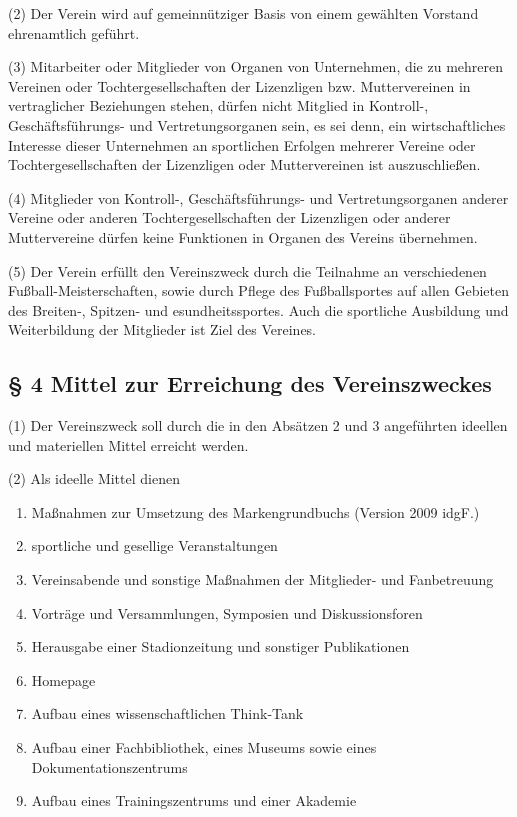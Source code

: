 \documentclass[10pt,a4paper]{article}
\begin{document}
(2)
Der Verein wird auf gemeinnütziger Basis von einem gewählten Vorstand ehrenamtlich geführt.

(3)
Mitarbeiter oder Mitglieder von Organen von Unternehmen, die zu mehreren Vereinen oder Tochtergesellschaften der Lizenzligen bzw. Muttervereinen in vertraglicher Beziehungen stehen, dürfen nicht Mitglied in Kontroll-, Geschäftsführungs- und Vertretungsorganen sein, es sei denn, ein wirtschaftliches Interesse dieser Unternehmen an sportlichen Erfolgen mehrerer Vereine oder Tochtergesellschaften der Lizenzligen oder Muttervereinen ist auszuschließen.

(4)
Mitglieder von Kontroll-, Geschäftsführungs- und Vertretungsorganen anderer Vereine oder anderen Tochtergesellschaften der Lizenzligen oder anderer Muttervereine dürfen keine Funktionen in Organen des Vereins übernehmen.

(5)
Der Verein erfüllt den Vereinszweck durch die Teilnahme an verschiedenen Fußball-Meisterschaften, sowie durch Pflege des Fußballsportes auf allen Gebieten des Breiten-, Spitzen- und esundheitssportes.
Auch die sportliche Ausbildung und Weiterbildung der Mitglieder ist Ziel des Vereines.

\subsection{§ 4
Mittel zur Erreichung des Vereinszweckes}

(1)
Der Vereinszweck soll durch die in den Absätzen 2 und 3 angeführten ideellen und materiellen Mittel erreicht werden.

(2)
Als ideelle Mittel dienen

\begin{enumerate}[label=\alph*)]
\item
Maßnahmen zur Umsetzung des Markengrundbuchs (Version 2009 idgF.)
\item
sportliche und gesellige Veranstaltungen
\item
Vereinsabende und sonstige Maßnahmen der Mitglieder- und Fanbetreuung
\item
Vorträge und Versammlungen, Symposien und Diskussionsforen
\item
Herausgabe einer Stadionzeitung und sonstiger Publikationen
\item
Homepage
\item
Aufbau eines wissenschaftlichen Think-Tank
\item
Aufbau einer Fachbibliothek, eines Museums sowie eines Dokumentationszentrums
\item
Aufbau eines Trainingszentrums und einer Akademie
\end{enumerate}
\end{document}
